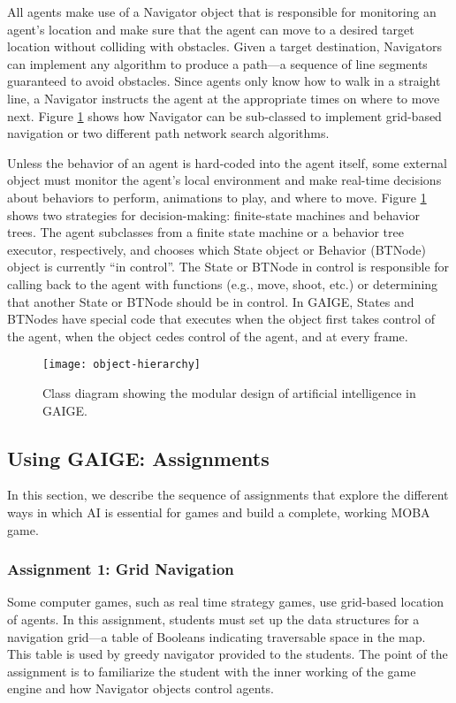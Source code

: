 \documentclass[letterpaper]{article}
\begin{document}
All agents make use of a Navigator object that is responsible for monitoring an agent's location and make sure that the agent can move to a desired target location without colliding with obstacles. 
Given a target destination, Navigators can implement any algorithm to produce a path---a sequence of line segments guaranteed to avoid obstacles.
Since agents only know how to walk in a straight line, a Navigator instructs the agent at the appropriate times on where to move next.
Figure \ref{fig:uml} shows how Navigator can be sub-classed to implement grid-based navigation or two different path network search algorithms.

Unless the behavior of an agent is hard-coded into the agent itself, some external object must monitor the agent's local environment and make real-time decisions about behaviors to perform, animations to play, and where to move. 
Figure  \ref{fig:uml} shows two strategies for decision-making: finite-state machines and behavior trees.
The agent subclasses from a finite state machine or a behavior tree executor, respectively, and chooses which State object or Behavior (BTNode) object is currently ``in control''.
The State or BTNode in control is responsible for calling back to the agent with functions (e.g., move, shoot, etc.) or determining that another State or BTNode should be in control.
In GAIGE, States and BTNodes have special code that executes when the object first takes control of the agent, when the object cedes control of the agent, and at every frame.

\begin{figure}
\texttt{[image: object-hierarchy]}
\caption{Class diagram showing the modular design of artificial intelligence in GAIGE.}
\label{fig:uml}
\end{figure}




\subsection{Using GAIGE: Assignments}

In this section, we describe the sequence of assignments that explore the different ways in which AI is essential for games and build a complete, working MOBA game.

\subsubsection{Assignment 1: Grid Navigation}
Some computer games, such as real time strategy games, use grid-based location of agents. 
In this assignment, students must set up the data structures for a navigation grid---a table of Booleans indicating traversable space in the map. This table is used by greedy navigator provided to the students. 
The point of the assignment is to familiarize the student with the inner working of the game engine and how Navigator objects control agents.
\end{document}
